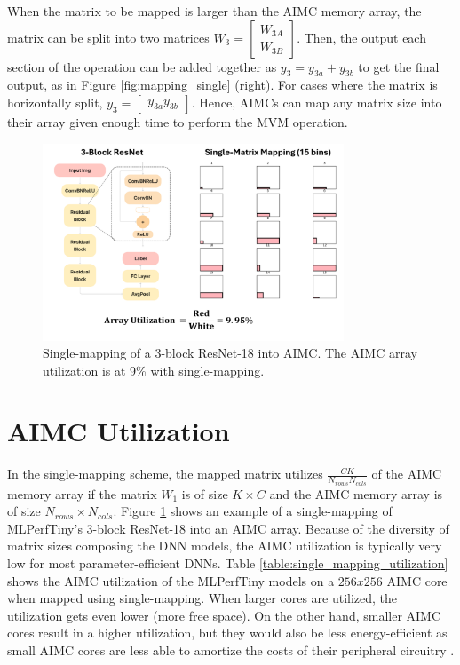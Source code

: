 When the matrix to be mapped is larger than the AIMC memory array, the matrix can be split into two matrices $W_3 = \begin{bmatrix} W_{3A} \\ W_{3B} \end{bmatrix}$. Then, the output each section of the operation can be added together as $y_3=y_{3a} + y_{3b}$ to get the final output, as in Figure \ref{fig:mapping_single} (right). For cases where the matrix is horizontally split, $y_3 = \begin{bmatrix} y_{3a} y_{3b} \end{bmatrix}$. Hence, AIMCs can map any matrix size into their array given enough time to perform the MVM operation.


\begin{figure}[htbp]
    \centering
    \includegraphics[width=0.8\textwidth]{images/mapping/resnet_singlemapping.png}
    \caption{Single-mapping of a 3-block ResNet-18 into AIMC. The AIMC array utilization is at 9\% with single-mapping.}
    \label{fig:resnet_singlemapping}
\end{figure}

\section{AIMC Utilization}

In the single-mapping scheme, the mapped matrix utilizes $\frac{CK}{N_{rows}N_{cols}}$ of the AIMC memory array if the matrix $W_1$ is of size $K \times C$ and the AIMC memory array is of size $N_{rows} \times N_{cols}$. Figure \ref{fig:resnet_singlemapping} shows an example of a single-mapping of MLPerfTiny's 3-block ResNet-18 into an AIMC array. Because of the diversity of matrix sizes composing the DNN models, the AIMC utilization is typically very low for most parameter-efficient DNNs. Table \ref{table:single_mapping_utilization} shows the AIMC utilization of the MLPerfTiny models on a $256x256$ AIMC core when mapped using single-mapping. When larger cores are utilized, the utilization gets even lower (more free space). On the other hand, smaller AIMC cores result in a higher utilization, but they would also be less energy-efficient as small AIMC cores are less able to amortize the costs of their peripheral circuitry \cite{murmann2020mixed}.


